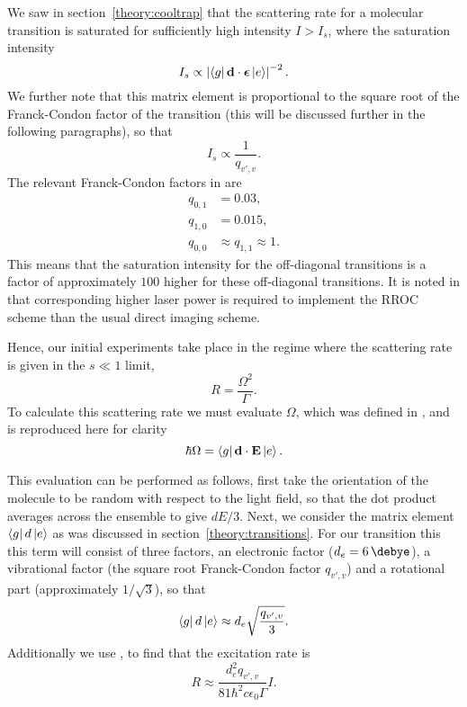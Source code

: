 We saw in section~\ref{theory:cooltrap} that the scattering rate for a
molecular transition is saturated for sufficiently high intensity $I>I_s$,
where the saturation intensity
%
\begin{equation}
  I_s \propto \left|\bra{g}\mathbf{d}\cdot\bm{\epsilon}\ket{e}\right|^{-2}.
\end{equation}
%
We further note that this matrix element is proportional to the square root of
the Franck-Condon factor of the transition (this will be discussed further in
the following paragraphs), so that
%
\begin{equation}
  I_s \propto \frac{1}{q_{v',v}}.
\end{equation}
%
The relevant Franck-Condon factors in \CaF{} are
%
\begin{align}
  q_{0,1} &= 0.03,\\
  q_{1,0} &= 0.015,\\
  q_{0,0} &\approx q_{1,1} \approx 1.
\end{align}
%
This means that the saturation intensity for the off-diagonal transitions is a
factor of approximately $100$ higher for these off-diagonal transitions. It is
noted in  that corresponding higher laser power is required
to implement the RROC scheme than the usual direct imaging scheme.

Hence, our initial experiments take place in the regime where the scattering
rate is given in the $s\ll1$ limit, 
%
\begin{equation}
  R = \frac{\Omega^2}{\Gamma}.
\end{equation}
%
To calculate this scattering rate we must evaluate $\Omega$, which was defined
in , and is reproduced here for clarity
%
\begin{equation}
  \centering
  \hbar \Omega = \bra{g}\mathbf{d}\cdot\mathbf{E}\ket{e}.
\end{equation}

This evaluation can be performed as follows, first take the orientation of
the molecule to be random with respect to the light field, so that the dot
product averages across the ensemble to give $dE/3$. Next, we consider the
matrix element $\bra{g}d\ket{e}$ as was discussed in
section~\ref{theory:transitions}. For our transition this this term will
consist of three factors, an electronic factor ($d_e=\SI{6}{\debye}$), a
vibrational factor (the square root Franck-Condon factor $q_{v',v}$) and a
rotational part (approximately $1/\sqrt{3}$), so that
%
\begin{equation}
  \bra{g}d\ket{e} \approx d_e\sqrt{\frac{q_{v', v}}{3}}.
\end{equation}
%
Additionally we use , to find that the excitation
rate is
%
\begin{equation}
  R \approx \frac{d_e^2 q_{v',v}}{81 \hbar^2 c \epsilon_0 \Gamma}I.
  \label{exper:eqn:actualscatterrate}
\end{equation}

